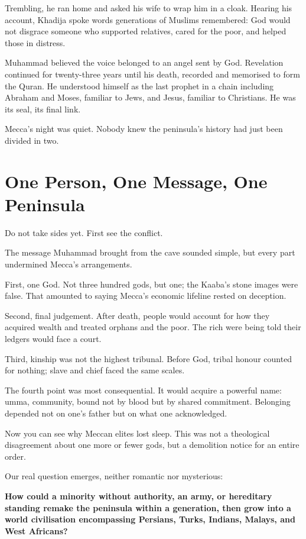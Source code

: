 Trembling, he ran home and asked his wife to wrap him in a cloak. Hearing his account, Khadija spoke words generations of Muslims remembered: God would not disgrace someone who supported relatives, cared for the poor, and helped those in distress.

Muhammad believed the voice belonged to an angel sent by God. Revelation continued for twenty-three years until his death, recorded and memorised to form the Quran. He understood himself as the last prophet in a chain including Abraham and Moses, familiar to Jews, and Jesus, familiar to Christians. He was its seal, its final link.

Mecca's night was quiet. Nobody knew the peninsula's history had just been divided in two.

\section{One Person, One Message, One Peninsula}
Do not take sides yet. First see the conflict.

The message Muhammad brought from the cave sounded simple, but every part undermined Mecca's arrangements.

First, one God. Not three hundred gods, but one; the Kaaba's stone images were false. That amounted to saying Mecca's economic lifeline rested on deception.

Second, final judgement. After death, people would account for how they acquired wealth and treated orphans and the poor. The rich were being told their ledgers would face a court.

Third, kinship was not the highest tribunal. Before God, tribal honour counted for nothing; slave and chief faced the same scales.

The fourth point was most consequential. It would acquire a powerful name: umma, community, bound not by blood but by shared commitment. Belonging depended not on one's father but on what one acknowledged.

Now you can see why Meccan elites lost sleep. This was not a theological disagreement about one more or fewer gods, but a demolition notice for an entire order.

Our real question emerges, neither romantic nor mysterious:

\textbf{How could a minority without authority, an army, or hereditary standing remake the peninsula within a generation, then grow into a world civilisation encompassing Persians, Turks, Indians, Malays, and West Africans?}

